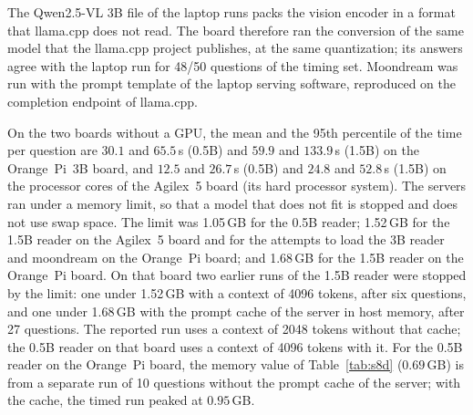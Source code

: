\documentclass[10pt]{article}
\begin{document}
The Qwen2.5-VL 3B file of the laptop runs packs the vision encoder in a format that llama.cpp does not read. The board therefore ran the conversion of the same model that the llama.cpp project publishes, at the same quantization; its answers agree with the laptop run for 48/50 questions of the timing set. Moondream was run with the prompt template of the laptop serving software, reproduced on the completion endpoint of llama.cpp.

On the two boards without a GPU, the mean and the 95th percentile of the time per question are $30.1$ and $65.5$\,s (0.5B) and $59.9$ and $133.9$\,s (1.5B) on the Orange~Pi~3B board, and $12.5$ and $26.7$\,s (0.5B) and $24.8$ and $52.8$\,s (1.5B) on the processor cores of the Agilex~5 board (its hard processor system). The servers ran under a memory limit, so that a model that does not fit is stopped and does not use swap space. The limit was 1.05\,GB for the 0.5B reader; 1.52\,GB for the 1.5B reader on the Agilex~5 board and for the attempts to load the 3B reader and moondream on the Orange~Pi board; and 1.68\,GB for the 1.5B reader on the Orange~Pi board. On that board two earlier runs of the 1.5B reader were stopped by the limit: one under 1.52\,GB with a context of 4096 tokens, after six questions, and one under 1.68\,GB with the prompt cache of the server in host memory, after 27 questions. The reported run uses a context of 2048 tokens without that cache; the 0.5B reader on that board uses a context of 4096 tokens with it. For the 0.5B reader on the Orange~Pi board, the memory value of Table~\ref{tab:s8d} ($0.69$\,GB) is from a separate run of 10 questions without the prompt cache of the server; with the cache, the timed run peaked at $0.95$\,GB.
\end{document}
